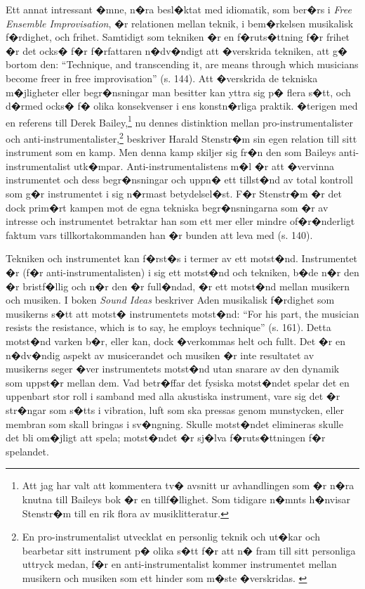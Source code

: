 \documentclass[a4paper]{article}
\begin{document}
Ett annat intressant �mne, n�ra besl�ktat med idiomatik, som ber�rs i \emph{Free Ensemble Improvisation}, �r relationen mellan teknik, i bem�rkelsen musikalisk f�rdighet, och frihet. Samtidigt som tekniken �r en f�ruts�ttning f�r frihet �r det ocks� f�r f�rfattaren n�dv�ndigt att �verskrida tekniken, att g� bortom den: ``Technique, and transcending it, are means through which musicians become freer in free improvisation'' (s. 144). Att �verskrida de tekniska m�jligheter eller begr�nsningar man besitter kan yttra sig p� flera s�tt, och d�rmed ocks� f� olika konsekvenser i ens konstn�rliga praktik. �terigen med en referens till Derek Bailey,\footnote{Att jag har valt att kommentera tv� avsnitt ur avhandlingen som �r n�ra knutna till Baileys bok �r en tillf�llighet. Som tidigare n�mnts h�nvisar Stenstr�m till en rik flora av musiklitteratur.} nu dennes distinktion mellan pro-instrumentalister och anti-instrumentalister,\footnote{En pro-instrumentalist utvecklat en personlig teknik och ut�kar och bearbetar sitt instrument p� olika s�tt f�r att n� fram till sitt personliga uttryck medan, f�r en anti-instrumentalist kommer instrumentet mellan musikern och musiken som ett hinder som m�ste �verskridas. \citep[s. 100]{bailey92}} beskriver Harald Stenstr�m sin egen relation till sitt instrument som en kamp. Men denna kamp skiljer sig fr�n den som Baileys anti-instrumentalist utk�mpar. Anti-instrumentalistens m�l �r att �vervinna instrumentet och dess begr�nsningar och uppn� ett tillst�nd av total kontroll som g�r instrumentet i sig n�rmast betydelsel�st. \citep[s. 100]{bailey92} F�r Stenstr�m �r det dock prim�rt kampen mot de egna tekniska begr�nsningarna som �r av intresse och instrumentet betraktar han som ett mer eller mindre of�r�nderligt faktum vars tillkortakommanden han �r bunden att leva med (s. 140).

Tekniken och instrumentet kan f�rst�s i termer av ett motst�nd. Instrumentet �r (f�r anti-instrumentalisten) i sig ett motst�nd och tekniken, b�de n�r den �r bristf�llig och n�r den �r full�ndad, �r ett motst�nd mellan musikern och musiken. I boken \emph{Sound Ideas} beskriver Aden \cite{evens05} musikalisk f�rdighet som musikerns s�tt att motst� instrumentets motst�nd: ``For his part, the musician resists the resistance, which is to say, he employs technique'' (s. 161). Detta motst�nd varken b�r, eller kan, dock �verkommas helt och fullt. Det �r en n�dv�ndig aspekt av musicerandet och musiken �r inte resultatet av musikerns seger �ver instrumentets motst�nd utan snarare av den dynamik som uppst�r mellan dem. Vad betr�ffar det fysiska motst�ndet spelar det en uppenbart stor roll i samband med alla akustiska instrument, vare sig det �r str�ngar som s�tts i vibration, luft som ska pressas genom munstycken, eller membran som skall bringas i sv�ngning. Skulle motst�ndet elimineras skulle det bli om�jligt att spela; motst�ndet �r sj�lva f�ruts�ttningen f�r spelandet. 
\end{document}
